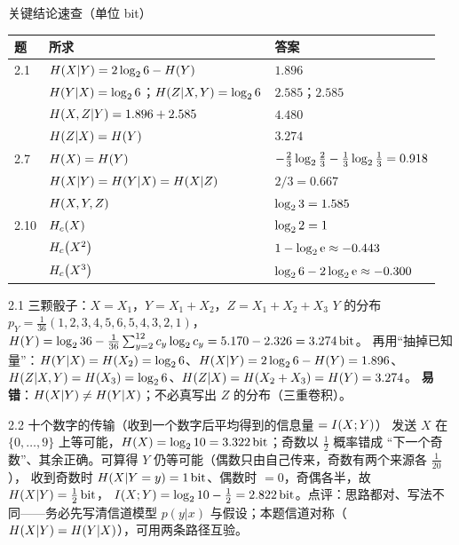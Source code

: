 \begin{keypoint}{关键结论速查（单位 bit）}
\begin{center}
\renewcommand{\arraystretch}{1.22}
\begin{tabular}{@{}lll@{}}
\toprule
题 & 所求 & 答案 \\
\midrule
2.1 & $H\!\left(X|Y\right)=2\log_{2}6-H\!\left(Y\right)$ & $1.896$ \\
    & $H\!\left(Y|X\right)=\log_{2}6$；$H\!\left(Z|X,Y\right)=\log_{2}6$ & $2.585$；$2.585$ \\
    & $H\!\left(X,Z|Y\right)=1.896+2.585$ & $4.480$ \\
    & $H\!\left(Z|X\right)=H\!\left(Y\right)$ & $3.274$ \\
\midrule
2.7 & $H\!\left(X\right)=H\!\left(Y\right)$ & $-\frac23\log_{2}\frac23-\frac13\log_{2}\frac13=0.918$ \\
    & $H\!\left(X|Y\right)=H\!\left(Y|X\right)=H\!\left(X|Z\right)$ & $2/3=0.667$ \\
    & $H\!\left(X,Y,Z\right)$ & $\log_{2}3=1.585$ \\
\midrule
2.10 & $H_{c}\!\left(X\right)$ & $\log_{2}2=1$ \\
     & $H_{c}\!\left(X^2\right)$ & $1-\log_{2}\mathrm{e}\approx-0.443$ \\
     & $H_{c}\!\left(X^3\right)$ & $\log_{2}6-2\log_{2}\mathrm{e}\approx-0.300$ \\
\bottomrule
\end{tabular}
\end{center}
\end{keypoint}

\begin{example}{2.1 三颗骰子：$X=X_1$，$Y=X_1+X_2$，$Z=X_1+X_2+X_3$}
$Y$ 的分布 $p_Y=\frac1{36}(1,2,3,4,5,6,5,4,3,2,1)$，
$H\!\left(Y\right)=\log_{2}36-\frac1{36}\sum_{y=2}^{12}c_y\log_{2} c_y=5.170-2.326=3.274\,\text{bit}$。
再用“抽掉已知量”：$H\!\left(Y|X\right)=H\!\left(X_2\right)=\log_{2}6$、$H\!\left(X|Y\right)=2\log_{2}6-H\!\left(Y\right)=1.896$、
$H\!\left(Z|X,Y\right)=H\!\left(X_3\right)=\log_{2}6$、$H\!\left(Z|X\right)=H\!\left(X_2+X_3\right)=H\!\left(Y\right)=3.274$。
\textbf{易错}：$H\!\left(X|Y\right)\neq H\!\left(Y|X\right)$；不必真写出 $Z$ 的分布（三重卷积）。
\end{example}

\begin{example}{2.2 十个数字的传输（收到一个数字后平均得到的信息量 $=I\!\left(X;Y\right)$）}
发送 $X$ 在 $\{0,\dots,9\}$ 上等可能，$H\!\left(X\right)=\log_{2}10=3.322\,\text{bit}$；奇数以 $\tfrac12$ 概率错成
“下一个奇数”、其余正确。可算得 $Y$ 仍等可能（偶数只由自己传来，奇数有两个来源各 $\frac1{20}$），
收到奇数时 $H\!\left(X|Y=y\right)=1\,\text{bit}$、偶数时 $=0$，奇偶各半，故 $H\!\left(X|Y\right)=\tfrac12\,\text{bit}$，
$I\!\left(X;Y\right)=\log_{2}10-\tfrac12=2.822\,\text{bit}$。点评：思路都对、写法不同——务必先写清信道模型
$p(y|x)$ 与假设；本题信道对称（$H\!\left(X|Y\right)=H\!\left(Y|X\right)$），可用两条路径互验。
\end{example}

